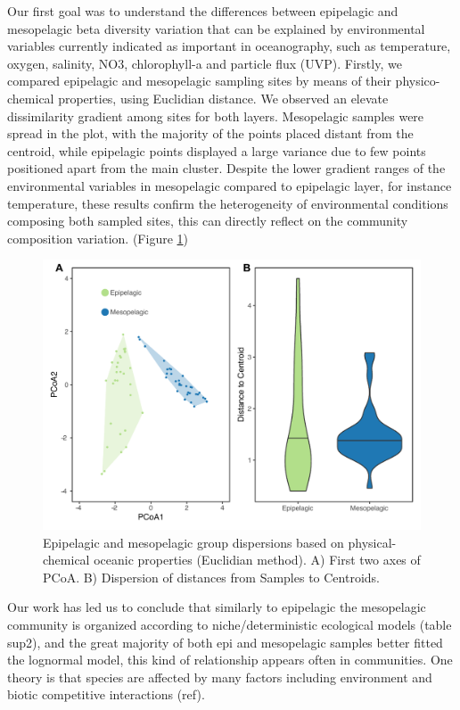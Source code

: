 \documentclass[fleqn,10pt]{wlscirep}
\begin{document}
Our first goal was to understand the differences between epipelagic and mesopelagic beta diversity variation that can be explained by environmental variables currently indicated as important in oceanography, such as temperature, oxygen, salinity, NO3, chlorophyll-a and particle flux (UVP). Firstly, we compared epipelagic and mesopelagic sampling sites by means of their physico-chemical properties, using Euclidian distance. We observed an elevate dissimilarity gradient among sites for both layers. Mesopelagic samples were spread in the plot, with the majority of the points placed distant from the centroid, while epipelagic points displayed a large variance due to few points positioned apart from the main cluster. Despite the lower gradient ranges of the environmental variables in mesopelagic compared to epipelagic layer, for instance temperature, these results confirm the heterogeneity of environmental conditions composing both sampled sites, this can directly reflect on the community composition variation.  (Figure \ref{fig:betadipersion})

\begin{figure}[ht]
    \centering
    \includegraphics[scale=0.5]{images/betadisp_diganose_to_print.pdf}
    \caption{Epipelagic and mesopelagic group dispersions based on physical-chemical oceanic properties (Euclidian method). A) First two axes of PCoA. B) Dispersion of distances from Samples to Centroids.}
    \label{fig:betadipersion}
\end{figure}

Our work has led us to conclude that similarly to epipelagic the mesopelagic community is organized according to niche/deterministic ecological models (table sup2), and the great majority of both epi and mesopelagic samples better fitted the lognormal model, this kind of relationship appears often in communities. One theory is that species are affected by many factors including environment and biotic competitive interactions (ref). 
\end{document}

